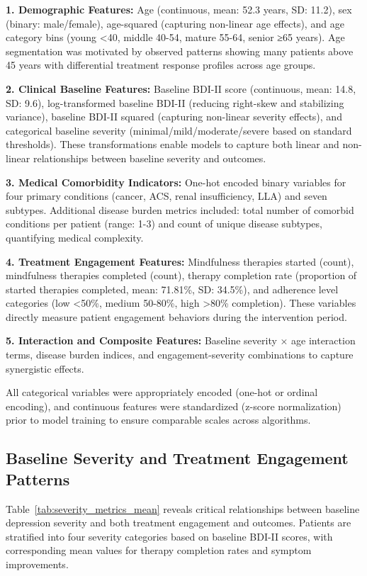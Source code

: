 \documentclass[conference]{IEEEtran}
\begin{document}
\textbf{1. Demographic Features:} Age (continuous, mean: 52.3 years, SD: 11.2), sex (binary: male/female), age-squared (capturing non-linear age effects), and age category bins (young <40, middle 40-54, mature 55-64, senior ≥65 years). Age segmentation was motivated by observed patterns showing many patients above 45 years with differential treatment response profiles across age groups.

\textbf{2. Clinical Baseline Features:} Baseline BDI-II score (continuous, mean: 14.8, SD: 9.6), log-transformed baseline BDI-II (reducing right-skew and stabilizing variance), baseline BDI-II squared (capturing non-linear severity effects), and categorical baseline severity (minimal/mild/moderate/severe based on standard thresholds). These transformations enable models to capture both linear and non-linear relationships between baseline severity and outcomes.

\textbf{3. Medical Comorbidity Indicators:} One-hot encoded binary variables for four primary conditions (cancer, ACS, renal insufficiency, LLA) and seven subtypes. Additional disease burden metrics included: total number of comorbid conditions per patient (range: 1-3) and count of unique disease subtypes, quantifying medical complexity.

\textbf{4. Treatment Engagement Features:} Mindfulness therapies started (count), mindfulness therapies completed (count), therapy completion rate (proportion of started therapies completed, mean: 71.81\%, SD: 34.5\%), and adherence level categories (low <50\%, medium 50-80\%, high >80\% completion). These variables directly measure patient engagement behaviors during the intervention period.

\textbf{5. Interaction and Composite Features:} Baseline severity × age interaction terms, disease burden indices, and engagement-severity combinations to capture synergistic effects.

All categorical variables were appropriately encoded (one-hot or ordinal encoding), and continuous features were standardized (z-score normalization) prior to model training to ensure comparable scales across algorithms.

\subsection{Baseline Severity and Treatment Engagement Patterns}

Table~\ref{tab:severity_metrics_mean} reveals critical relationships between baseline depression severity and both treatment engagement and outcomes. Patients are stratified into four severity categories based on baseline BDI-II scores, with corresponding mean values for therapy completion rates and symptom improvements.
\end{document}
